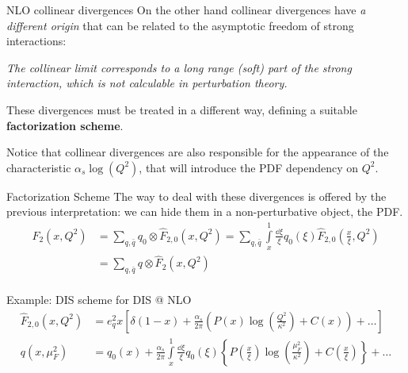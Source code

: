 \documentclass[9pt]{beamer}
\begin{document}
\begin{frame}{NLO collinear divergences}
    On the other hand collinear divergences have \textit{a different origin}
    that can be related to the asymptotic freedom of strong interactions:
    
    \begin{center}
        \textit{The collinear limit corresponds to a long range (soft) part of
        the strong interaction, which is not calculable in perturbation
        theory.}
    \end{center}

    These divergences must be treated in a different way, defining a suitable
    \textbf{factorization scheme}.\newline

    Notice that collinear divergences are also responsible for the appearance
    of the characteristic $\alpha_s \log(Q^2)$, that will introduce the PDF
    dependency on $Q^2$.
\end{frame}
    
\begin{frame}{Factorization Scheme}
    \vspace*{15pt}
    The way to deal with these divergences is offered by the previous
    interpretation: we can hide them in a non-perturbative object, the PDF.
    \begin{align*}
        F_2(x,Q^2) &= \sum_{q,\bar{q}} q_0 \otimes \hat{F}_{2,0} (x, Q^2) =
        \sum_{q,\bar{q}} \int\limits_x^1 \frac{\dd\xi}{\xi} q_0(\xi)
        \hat{F}_{2,0}\left(\frac{x}{\xi},Q^2\right)\\
        &= \sum_{q,\bar{q}} q \otimes \hat{F}_2 (x, Q^2)\\
    \end{align*}
    \vspace*{-15pt}

    Example: DIS scheme for DIS @ NLO
    \begin{align*}
        \hat{F}_{2,0}(x,Q^2) &= e_q^2 x \left[ \delta(1-x) +
        \frac{\alpha_s}{2\pi}\left(P(x) \log(\frac{Q^2}{\kappa^2}) +
        C(x)\right) + \dots \right]\\
        q(x, \mu^2_F) &= q_0(x) + \frac{\alpha_s}{2\pi} \int\limits_x^1
        \frac{\dd \xi}{\xi} q_0(\xi) \left\{ P\left(\frac{x}{\xi}\right)
        \log(\frac{\mu^2_F}{\kappa^2}) + C\left(\frac{x}{\xi}\right)\right\} +
        \dots
    \end{align*}
\end{frame}
\end{document}
